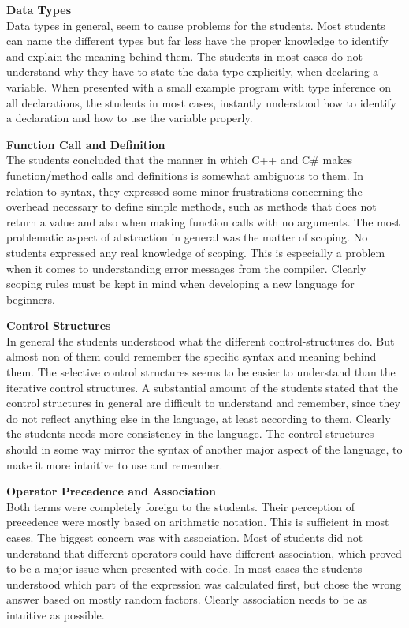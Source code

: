 \textbf{Data Types}\\
Data types in general, seem to cause problems for the students. 
Most students can name the different types but far less have the proper knowledge to identify and explain the meaning behind them. 
The students in most cases do not understand why they have to state the data type explicitly, when declaring a variable. 
When presented with a small example program with type inference on all declarations, the students in most cases, instantly understood how to identify a declaration and how to use the variable properly.

\textbf{Function Call and Definition}\\
The students concluded that the manner in which C++ and C{\#} makes function/method calls and definitions is somewhat ambiguous to them. 
In relation to syntax, they expressed some minor frustrations concerning the overhead necessary to define simple methods, such as methods that does not return a value and also when making function calls with no arguments. 
The most problematic aspect of abstraction in general was the matter of scoping. 
No students expressed any real knowledge of scoping. 
This is especially a problem when it comes to understanding error messages from the compiler. 
Clearly scoping rules must be kept in mind when developing a new language for beginners.

\textbf{Control Structures}\\
In general the students understood what the different control-structures do. 
But almost non of them could remember the specific syntax and meaning behind them. 
The selective control structures seems to be easier to understand than the iterative control structures. 
A substantial amount of the students stated that the control structures in general are difficult to understand and remember, since they do not reflect anything else in the language, at least according to them.
Clearly the students needs more consistency in the language. 
The control structures should in some way mirror the syntax of another major aspect of the language, to make it more intuitive to use and remember.

\textbf{Operator Precedence and Association}\\
Both terms were completely foreign to the students. 
Their perception of precedence were mostly based on arithmetic notation. 
This is sufficient in most cases. 
The biggest concern was with association. 
Most of students did not understand that different operators could have different association, which proved to be a major issue when presented with code. 
In most cases the students understood which part of the expression was calculated first, but chose the wrong answer based on mostly random factors. 
Clearly association needs to be as intuitive as possible.


